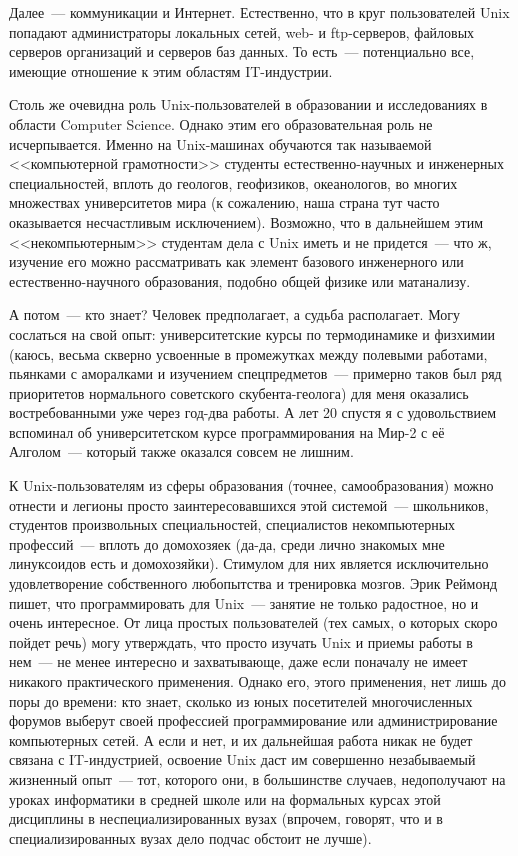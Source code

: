 Далее~--- коммуникации и Интернет. Естественно, что в круг пользователей Unix попадают администраторы локальных сетей, web- и ftp-серверов, файловых серверов организаций и серверов баз данных. То есть~--- потенциально все, имеющие отношение к этим областям IT-индустрии.

Столь же очевидна роль Unix-пользователей в образовании и исследованиях в области Computer Science. Однако этим его образовательная роль не исчерпывается. Именно на Unix-машинах обучаются так называемой <<компьютерной грамотности>> студенты естественно-научных и инженерных специальностей, вплоть до геологов, геофизиков, океанологов, во многих множествах университетов мира (к сожалению, наша страна тут часто оказывается несчастливым исключением). Возможно, что в дальнейшем этим <<некомпьютерным>> студентам дела с Unix иметь и не придется~--- что ж, изучение его можно рассматривать как элемент базового инженерного или естественно-научного образования, подобно общей физике или матанализу.

А потом~--- кто знает? Человек предполагает, а судьба располагает. Могу сослаться на свой опыт: университетские курсы по термодинамике и физхимии (каюсь, весьма скверно усвоенные в промежутках между полевыми работами, пьянками с аморалками и изучением спецпредметов~--- примерно таков был ряд приоритетов нормального советского скубента-геолога) для меня оказались востребованными уже через год-два работы. А лет 20 спустя я с удовольствием вспоминал об университетском курсе программирования на Мир-2 с её Алголом~--- который также оказался совсем не лишним.

К Unix-пользователям из сферы образования (точнее, самообразования) можно отнести и легионы просто заинтересовавшихся этой системой~--- школьников, студентов произвольных специальностей, специалистов некомпьютерных профессий~--- вплоть до домохозяек (да-да, среди лично знакомых мне линуксоидов есть и домохозяйки). Стимулом для них является исключительно удовлетворение собственного любопытства и тренировка мозгов. Эрик Реймонд пишет, что программировать для Unix~--- занятие не только радостное, но и очень интересное. От лица простых пользователей (тех самых, о которых скоро пойдет речь) могу утверждать, что просто изучать Unix и приемы работы в нем~--- не менее интересно и захватывающе, даже если поначалу не имеет никакого практического применения. Однако его, этого применения, нет лишь до поры до времени: кто знает, сколько из юных посетителей многочисленных форумов выберут своей профессией программирование или администрирование компьютерных сетей. А если и нет, и их дальнейшая работа никак не будет связана с IT-индустрией, освоение Unix даст им совершенно незабываемый жизненный опыт~--- тот, которого они, в большинстве случаев, недополучают на уроках информатики в средней школе или на формальных курсах этой дисциплины в неспециализированных вузах (впрочем, говорят, что и в специализированных вузах дело подчас обстоит не лучше).

